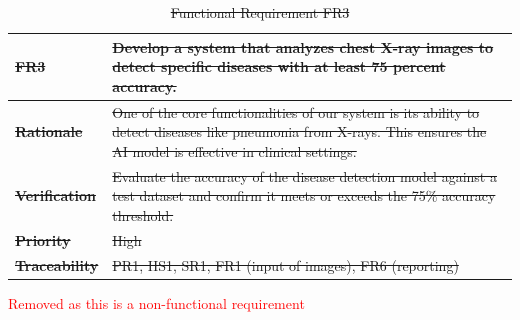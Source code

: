 \documentclass[12pt]{article}
\begin{document}
\begin{table}[h!]
\centering
{}
\begin{tabular}{|p{3.5cm}|p{11.5cm}|}
\hline
\rowcolor{gray!30}
\textbf{\sout{FR3}} & \sout{Develop a system that analyzes chest X-ray images to detect specific diseases with at least 75 percent accuracy.} \\
\hline
\textbf{\sout{Rationale}} & \sout{One of the core functionalities of our system is its ability to detect diseases like pneumonia from X-rays. This ensures the AI model is effective in clinical settings.} \\
\hline
\textbf{\sout{Verification}} & \sout{Evaluate the accuracy of the disease detection model against a test dataset and confirm it meets or exceeds the 75\% accuracy threshold.} \\
\hline
\textbf{\sout{Priority}} & \sout{High} \\
\hline
\textbf{\sout{Traceability}} & \sout{PR1, HS1, SR1, FR1 (input of images), FR6 (reporting)} \\
\hline
\end{tabular}
\caption{\sout{Functional Requirement FR3}}
\textcolor{red}{Removed as this is a non-functional requirement }
\end{table}
\end{document}
